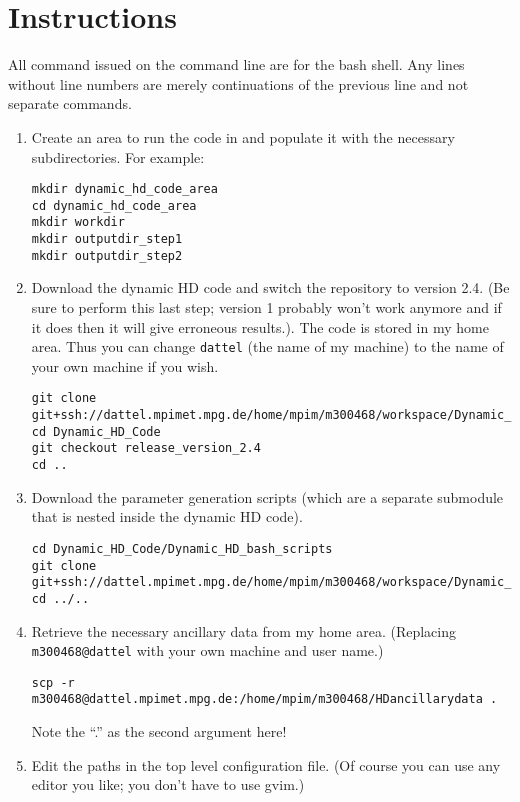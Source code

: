 \documentclass{article}
\begin{document}
\section{Instructions}
All command issued on the command line are for the bash shell. Any lines without line numbers are merely continuations of the previous line and not separate commands.
\begin{enumerate}
\item Create an area to run the code in and populate it with the necessary subdirectories. For example:
\begin{lstlisting}[style=bash_input]
mkdir dynamic_hd_code_area
cd dynamic_hd_code_area
mkdir workdir
mkdir outputdir_step1
mkdir outputdir_step2
\end{lstlisting}
\item Download the dynamic HD code and switch the repository to version 2.4. (Be sure to perform this last step; version 1 probably won't work anymore and if it does then it will give erroneous results.). The code is stored in my home area. Thus you can change  \lstinline[style=bash_input]{dattel} (the name of my machine) to the name of your own machine if you wish.
\begin{lstlisting}[style=bash_input,breaklines=true]
git clone git+ssh://dattel.mpimet.mpg.de/home/mpim/m300468/workspace/Dynamic_HD_Code
cd Dynamic_HD_Code
git checkout release_version_2.4
cd ..
\end{lstlisting}
\item Download the parameter generation scripts (which are a separate submodule that is nested inside the dynamic HD code). 
\begin{lstlisting}[style=bash_input,breaklines=true]
cd Dynamic_HD_Code/Dynamic_HD_bash_scripts
git clone git+ssh://dattel.mpimet.mpg.de/home/mpim/m300468/workspace/Dynamic_HD_Code/Dynamic_HD_bash_scripts/parameter_generation_scripts
cd ../..
\end{lstlisting}
\item Retrieve the necessary ancillary data from my home area. (Replacing \lstinline[style=bash_input]{m300468@dattel} with your own machine and user name.)
\begin{lstlisting}[style=bash_input,breaklines=true]
scp -r m300468@dattel.mpimet.mpg.de:/home/mpim/m300468/HDancillarydata .
\end{lstlisting}
Note the ``.'' as the second argument here!
\item Edit the paths in the top level configuration file. (Of course you can use any editor you like; you don't have to use gvim.)

\end{enumerate}
\end{document}
